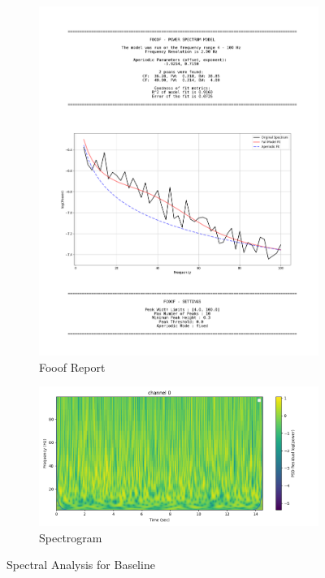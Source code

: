 \documentclass[12pt, letterpaper]{article}
\begin{document}
\begin{figure}[H]
    \centering
    \begin{subfigure}{.75\textwidth}
      \centering
      \includegraphics[width=\textwidth]{output/baseline-psd}
      \caption{Fooof Report}
      \label{fig:baseline-psd}
    \end{subfigure}
    \begin{subfigure}{.75\textwidth}
      \centering
      \includegraphics[width=\textwidth]{output/baseline-spectrogram}
      \caption{Spectrogram}
      \label{fig:baseline-spectrogram}
    \end{subfigure}
    \caption{Spectral Analysis for Baseline}
\end{figure}
\end{document}
